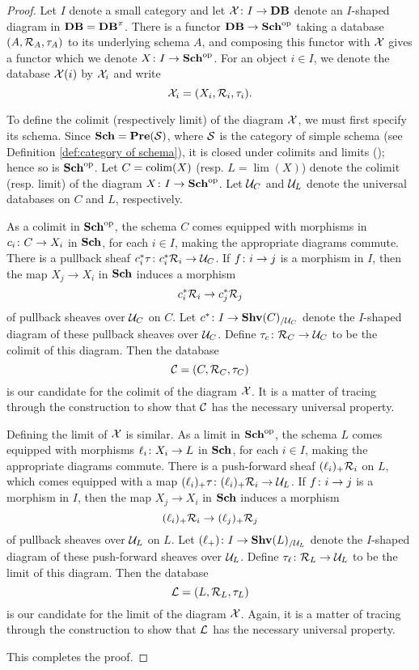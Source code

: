 \documentclass{amsart}
\begin{document}
\begin{proof}

Let $I$ denote a small category and let $\mathcal{X}\colon I\rightarrow{\bf DB}$ denote an $I$-shaped diagram in ${\bf DB}={\bf DB}^\pi$.  There is a functor ${\bf DB}\rightarrow{\bf Sch}^\textnormal{op}$ taking a database $(A,\mathcal{R}_A,\tau_A)$ to its underlying schema $A$, and composing this functor with $\mathcal{X}$ gives a functor which we denote $X\colon I\rightarrow{\bf Sch}^\textnormal{op}$.  For an object $i\in I$, we denote the database $\mathcal{X}(i)$ by $\mathcal{X}_i$ and write $$\mathcal{X}_i=(X_i,\mathcal{R}_i,\tau_i).$$

To define the colimit (respectively limit) of the diagram $\mathcal{X}$, we must first specify its schema.  Since ${\bf Sch}={\bf Pre}(\mathcal{S})$, where $\mathcal{S}$ is the category of simple schema (see Definition \ref{def:category of schema}), it is closed under colimits and limits (\cite[p. 22]{MM}); hence so is ${\bf Sch}^\textnormal{op}$.  Let $C=\mathop{\textnormal{colim}}(X)$ (resp. $L=\lim(X)$) denote the colimit (resp. limit) of the diagram $X\colon I\rightarrow{\bf Sch}^\textnormal{op}$.  Let $\mathcal{U}_C$ and $\mathcal{U}_L$ denote the universal databases on $C$ and $L$, respectively.

As a colimit in ${\bf Sch}^\textnormal{op}$, the schema $C$ comes equipped with morphisms in $c_i\colon C\rightarrow X_i$ in ${\bf Sch}$, for each $i\in I$, making the appropriate diagrams commute.  There is a pullback sheaf $c_i^*\tau\colon c_i^*\mathcal{R}_i\rightarrow\mathcal{U}_C$.  If $f\colon i\rightarrow j$ is a morphism in $I$, then the map $X_j\to X_i$ in ${\bf Sch}$ induces a morphism $$c_i^*\mathcal{R}_i\rightarrow c_j^*\mathcal{R}_j$$ of pullback sheaves over $\mathcal{U}_C$ on $C$.  Let $c^*\colon I\rightarrow{\bf Shv}(C)_{/\mathcal{U}_C}$ denote the $I$-shaped diagram of these pullback sheaves over $\mathcal{U}_C$.  Define $\tau_c\colon\mathcal{R}_C\rightarrow\mathcal{U}_C$ to be the colimit of this diagram.  Then the database $$\mathcal{C}=(C,\mathcal{R}_C,\tau_C)$$ is our candidate for the colimit of the diagram $\mathcal{X}$.  It is a matter of tracing through the construction to show that $\mathcal{C}$ has the necessary universal property.

Defining the limit of $\mathcal{X}$ is similar.  As a limit in ${\bf Sch}^\textnormal{op}$, the schema $L$ comes equipped with morphisms $\ell_i\colon X_i\rightarrow L$ in ${\bf Sch}$, for each $i\in I$, making the appropriate diagrams commute.  There is a push-forward sheaf $(\ell_i)_+\mathcal{R}_i$ on $L$, which comes equipped with a map $(\ell_i)_+\tau\colon(\ell_i)_+\mathcal{R}_i\rightarrow\mathcal{U}_L$.  If $f\colon i\rightarrow j$ is a morphism in $I$, then the map $X_j\to X_i$ in ${\bf Sch}$ induces a morphism $$(\ell_i)_+\mathcal{R}_i\rightarrow(\ell_j)_+\mathcal{R}_j$$ of pullback sheaves over $\mathcal{U}_L$ on $L$.  Let $(\ell_+)\colon I\rightarrow{\bf Shv}(L)_{/\mathcal{U}_L}$ denote the $I$-shaped diagram of these push-forward sheaves over $\mathcal{U}_L$.  Define $\tau_\ell\colon\mathcal{R}_L\rightarrow\mathcal{U}_L$ to be the limit of this diagram.  Then the database $$\mathcal{L}=(L,\mathcal{R}_L,\tau_L)$$ is our candidate for the limit of the diagram $\mathcal{X}$.  Again, it is a matter of tracing through the construction to show that $\mathcal{L}$ has the necessary universal property.  

This completes the proof.

\end{proof}
\end{document}
